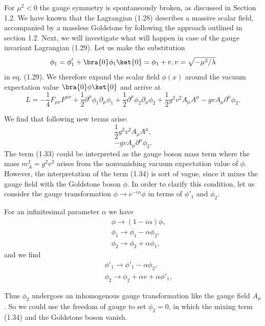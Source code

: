 For $\mu^2<0$ the gauge symmetry is spontaneously broken, as discussed in Section 1.2. We have known that the Lagrangian (1.28) describes a massive scalar field, accompanied by a massless Goldstone by following the approach outlined in section 1.2. Next, we will investigate what will happen in case of the  gauge invariant Lagrangian (1.29). Let us make the substitution
\begin{equation}
\phi_1=\phi'_1+\bra{0}\phi_1\ket{0}=\phi_1+v, v=\sqrt{-\mu^2/\lambda}
\end{equation} 
in eq. (1.29). We therefore expand the scalar field $\phi(x)$ around the vacuum expectation value $\bra{0}\phi\ket{0}$ and arrive at
\begin{equation}
L=-\frac{1}{4}F_{\mu\nu}F^{\mu\nu}+\frac{1}{2}\partial^\mu \phi_1\partial_\mu\phi_1+\frac{1}{2}\partial^\mu \phi_2\partial_\mu\phi_2+\frac{1}{2}g^2v^2 A_\mu A^\mu - gvA_\mu\partial^\mu\phi_2.
\end{equation}

We find that following new terms arise:
\begin{equation}
\frac{1}{2}g^2v^2 A_\mu A^\mu,
\end{equation}
\begin{equation}
 - gvA_\mu\partial^\mu\phi_2.
\end{equation}
The term (1.33) could be interpreted as the gauge boson mass term where the mass $m_A^2 = g^2v^2$ arises from the nonvanishing vacuum expectation value of $\phi$. However, the interpretation of the term (1.34) is sort of vague, since it mixes the gauge field with the Goldstone boson $\phi$. In order to clarify this condition, let us consider the gauge transformation $\phi\to e^{-i\alpha}\phi$ in terms of $\phi'_1$ and $\phi_2$.

For an infinitesimal parameter $\alpha$ we have
\begin{eqnarray}
&&\phi\to(1-i\alpha)\phi,\nonumber\\
&&\phi_1\to\phi_1-\alpha\phi_2,\nonumber\\
&&\phi_2\to\phi_2+\alpha\phi_1,
\end{eqnarray}
and we find
\begin{eqnarray}
&&\phi'_1\to\phi'_1-\alpha\phi_2,\nonumber\\
&&\phi_2\to\phi_2+\alpha v+\alpha\phi'_1,
\end{eqnarray}

Thus $\phi_2$ undergoes an inhomogenous gauge transformation like the gauge field $A_\mu$. So we could use the freedom of gauge to set $\phi_2=0$, in which the mixing term (1.34) and the Goldstone boson vanish. 

